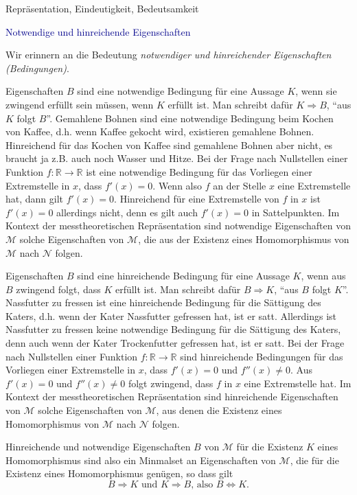 \documentclass[
  8pt,
  ignorenonframetext,
]{beamer}
\begin{document}
\begin{frame}{Repräsentation, Eindeutigkeit, Bedeutsamkeit}
\protect\hypertarget{repruxe4sentation-eindeutigkeit-bedeutsamkeit-1}{}
\small

\textcolor{darkblue}{Notwendige und hinreichende Eigenschaften}
\footnotesize

Wir erinnern an die Bedeutung \emph{notwendiger und hinreichender
Eigenschaften (Bedingungen)}.

Eigenschaften \(B\) sind eine notwendige Bedingung für eine Aussage
\(K\), wenn sie zwingend erfüllt sein müssen, wenn \(K\) erfüllt ist.
Man schreibt dafür \(K \Rightarrow B\), ``aus \(K\) folgt \(B\)''.
Gemahlene Bohnen sind eine notwendige Bedingung beim Kochen von Kaffee,
d.h. wenn Kaffee gekocht wird, existieren gemahlene Bohnen. Hinreichend
für das Kochen von Kaffee sind gemahlene Bohnen aber nicht, es braucht
ja z.B. auch noch Wasser und Hitze. Bei der Frage nach Nullstellen einer
Funktion \(f : \mathbb{R} \to \mathbb{R}\) ist eine notwendige Bedingung
für das Vorliegen einer Extremstelle in \(x\), dass \(f'(x) = 0\). Wenn
also \(f\) an der Stelle \(x\) eine Extremstelle hat, dann gilt
\(f'(x) = 0\). Hinreichend für eine Extremstelle von \(f\) in \(x\) ist
\(f'(x) = 0\) allerdings nicht, denn es gilt auch \(f'(x) = 0\) in
Sattelpunkten. Im Kontext der messtheoretischen Repräsentation sind
notwendige Eigenschaften von \(\mathcal{M}\) solche Eigenschaften von
\(\mathcal{M}\), die aus der Existenz eines Homomorphismus von
\(\mathcal{M}\) nach \(\mathcal{N}\) folgen.

Eigenschaften \(B\) sind eine hinreichende Bedingung für eine Aussage
\(K\), wenn aus \(B\) zwingend folgt, dass \(K\) erfüllt ist. Man
schreibt dafür \(B \Rightarrow K\), ``aus \(B\) folgt \(K\)''.
Nassfutter zu fressen ist eine hinreichende Bedingung für die Sättigung
des Katers, d.h. wenn der Kater Nassfutter gefressen hat, ist er satt.
Allerdings ist Nassfutter zu fressen keine notwendige Bedingung für die
Sättigung des Katers, denn auch wenn der Kater Trockenfutter gefressen
hat, ist er satt. Bei der Frage nach Nullstellen einer Funktion
\(f : \mathbb{R} \to \mathbb{R}\) sind hinreichende Bedingungen für das
Vorliegen einer Extremstelle in \(x\), dass \(f'(x) = 0\) und
\(f''(x) \neq 0\). Aus \(f'(x) = 0\) und \(f''(x) \neq 0\) folgt
zwingend, dass \(f\) in \(x\) eine Extremstelle hat. Im Kontext der
messtheoretischen Repräsentation sind hinreichende Eigenschaften von
\(\mathcal{M}\) solche Eigenschaften von \(\mathcal{M}\), aus denen die
Existenz eines Homomorphismus von \(\mathcal{M}\) nach \(\mathcal{N}\)
folgen.

Hinreichende und notwendige Eigenschaften \(B\) von \(\mathcal{M}\) für
die Existenz \(K\) eines Homomorphismus sind also ein Minmalset an
Eigenschaften von \(\mathcal{M}\), die für die Existenz eines
Homomorphismus genügen, so dass gilt \begin{equation}
B \Rightarrow K \mbox{ und } K \Rightarrow B \mbox{, also } B \Leftrightarrow K.
\end{equation}
\end{frame}
\end{document}
